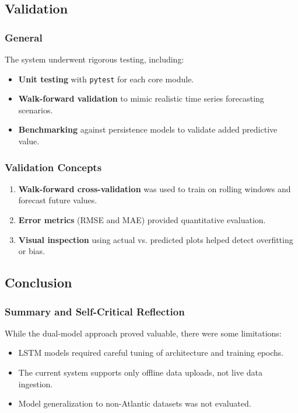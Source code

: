 \subsection{Validation}

\subsubsection{General}
The system underwent rigorous testing, including:
\begin{itemize}
	\item \textbf{Unit testing} with \texttt{pytest} for each core module.
	\item \textbf{Walk-forward validation} to mimic realistic time series forecasting scenarios.
	\item \textbf{Benchmarking} against persistence models to validate added predictive value.
\end{itemize}

\subsubsection{Validation Concepts}
\begin{enumerate}
	\item \textbf{Walk-forward cross-validation} was used to train on rolling windows and forecast future values.
	\item \textbf{Error metrics} (RMSE and MAE) provided quantitative evaluation.
	\item \textbf{Visual inspection} using actual vs. predicted plots helped detect overfitting or bias.
\end{enumerate}

\subsection{Conclusion}

\subsubsection{Summary and Self-Critical Reflection}
While the dual-model approach proved valuable, there were some limitations:
\begin{itemize}
	\item LSTM models required careful tuning of architecture and training epochs.
	\item The current system supports only offline data uploads, not live data ingestion.
	\item Model generalization to non-Atlantic datasets was not evaluated.
\end{itemize}

